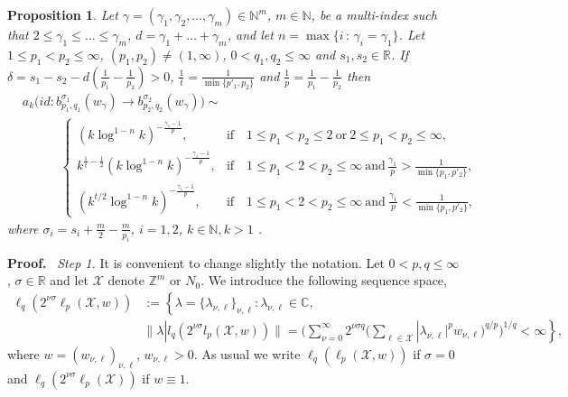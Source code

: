 \documentclass[12pt]{article}
\newtheorem{Prop}{Proposition}
\newcommand{\bpr}{{\bf Proof.}\ }
\newcommand{\R}{{\mathbb R}}
\newcommand{\N}{{\mathbb N}}
\newcommand{\Z}{\mathbb Z}
\newcommand{\C}{{\mathbb C}}
\begin{document}
\begin{Prop} \label{main2seq}
	Let $\gamma= (\gamma_1 , \gamma_2, \ldots , \gamma_m)\in \N^m$, $m\in \N$,   be a multi-index such that 
	$2\le \gamma_1\le \ldots \le \gamma_m$, %
	$d= \gamma_1+ \ldots + \gamma_m$, and let $n = \max\{ i\,:\, \gamma_i=\gamma_1\}$.  %
	Let $1\le p_1<p_2\le\infty$, $(p_1,p_2)\not= (1,\infty)$, $0<q_1,q_2\le \infty$ and  $s_1,s_2\in \R$.  If $\delta=s_1-s_2-d(\frac{1}{p_1}-\frac{1}{p_2})>0$,   $\frac{1}{t}=\frac{1}{\min\{p'_1,p_2\}}$  and $\frac{1}{p}=\frac{1}{p_1}-\frac{1}{p_2}$ then 
	\begin{align*}
		& a_k\big(id: b^{\sigma_1}_{p_1,q_1}( w_\gamma)\rightarrow  b^{\sigma_2}_{p_2,q_2}( w_\gamma) \big) \sim \\
		&\qquad\quad\left\{ \begin{array}{ll} (k\log^{1-n} k)^{-\frac{\gamma_{1}-1}{p}}, &{\mathrm{if}\quad 1\leq p_1< p_2\leq2\ \mathrm{or}\ 2\leq p_1<p_2\leq\infty,}\\   k^{\frac{1}{t}-\frac{1}{2}}(k\log^{1-n} k)^{-\frac{\gamma_{1}-1}{p}}, &{\mathrm{if}\quad 1\leq p_1<2< p_2 \leq\infty \ \mathrm{and}\,  %
		\frac{\gamma_1}{p} > \frac{1}{\min\{p_1,p'_2\}},}\\ 
			(k^{t/2}\log^{1-n} k)^{-\frac{\gamma_{1}-1}{p}}, &{\mathrm{if}\quad 1\leq p_1<2< p_2 \leq\infty \ \mathrm{and}\ %
		\frac{\gamma_1}{p} < \frac{1}{\min\{p_1,p'_2\}},}	
	\end{array}\right.
	\end{align*}	
	where $\sigma_i= s_i +\frac{m}{2}- \frac{m}{p_i}$, $i=1,2$, $k\in\N, k>1$ .
\end{Prop}

\bpr
{\em Step 1.}
It is convenient to change slightly the notation. Let $0<p,q\le \infty$, $\sigma\in \R$ and let  ${\mathcal X}$ denote $\Z^m$ or $N_0$. We introduce the following sequence space,
\begin{align}\label{lspace}
	\ell_q(2^{\nu \sigma}\ell_p({\mathcal X}, w)) &:= \left\{\right.  \lambda=\{\lambda_{\nu,\ell}\}_{\nu,\ell}: \lambda_{\nu,\ell}\in\C, \\ 
	&\left. \|\lambda|l_q(2^{\nu\sigma}l_p({\mathcal X},w))\| = \bigg(\sum_{\nu=0}^\infty 2^{\nu\sigma q}\Big(\sum_{\ell\in {\mathcal X}} |\lambda_{\nu,\ell}|^p w_{\nu,\ell} \Big)^{q/p}\bigg)^{1/q}<\infty \right\} , \nonumber
\end{align}
where  $w= (w_{\nu,\ell})_{\nu,\ell}$, $w_{\nu,\ell} >0$. As usual we write $\ell_q(\ell_p({\mathcal X}, w))$ if $\sigma=0$ and $\ell_q(2^{\nu \sigma}\ell_p({\mathcal X}))$ if $w \equiv 1$. 
\end{document}
